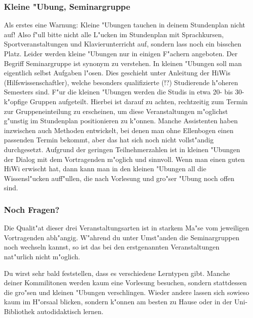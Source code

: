 \subsubsection*{Kleine "Ubung, Seminargruppe}

Als erstes eine Warnung: Kleine "Ubungen tauchen in deinem Stundenplan nicht auf!
Also f"ull bitte nicht alle L"ucken im
Stundenplan mit Sprachkursen, Sportveranstaltungen und Klavierunterricht auf,
sondern lass noch ein bisschen Platz. Leider werden kleine "Ubungen nur in
einigen F"achern angeboten. Der Begriff Seminargruppe ist synonym zu verstehen.
In kleinen "Ubungen soll man eigentlich selbst Aufgaben l"osen. Dies geschieht
unter Anleitung der HiWis (Hilfswissenschaftler), welche besonders qualifizierte
(!?) Studierende h"oheren Semesters sind. F"ur die kleinen "Ubungen werden die
Studis in etwa 20- bis 30-k"opfige Gruppen aufgeteilt. Hierbei ist darauf zu
achten, rechtzeitig zum Termin zur Gruppeneinteilung zu erscheinen, um diese
Veranstaltungen m"oglichst g"unstig im Stundenplan positionieren zu k"onnen.
Manche Assistenten haben inzwischen auch Methoden entwickelt, bei denen man
ohne Ellenbogen einen passenden Termin bekommt, aber das hat sich noch nicht
vollst"andig durchgesetzt. Aufgrund der geringen Teilnehmerzahlen ist in
kleinen "Ubungen der Dialog mit dem Vortragenden m"oglich und sinnvoll. Wenn
man einen guten HiWi erwischt hat, dann kann man in den kleinen "Ubungen all
die Wissensl"ucken auff"ullen, die nach Vorlesung und gro"ser "Ubung noch offen
sind.


\subsubsection*{Noch Fragen?}

Die Qualit"at dieser drei Veranstaltungsarten ist in starkem Ma"se vom
jeweiligen Vortragenden abh"angig. W"ahrend du unter Umst"anden die
Seminargruppen noch wechseln kannst, so ist das bei den erstgenannten
Veranstaltungen nat"urlich nicht m"oglich.

Du wirst sehr bald feststellen, dass es verschiedene Lerntypen gibt. Manche
deiner Kommilitonen werden kaum eine Vorlesung besuchen, sondern stattdessen die gro"sen
und kleinen "Ubungen verschlingen. Wieder andere lassen sich sowieso kaum im
H"orsaal blicken, sondern k"onnen am besten zu Hause oder in der Uni-Bibliothek
autodidaktisch lernen.

